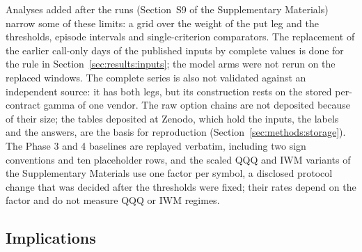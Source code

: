 Analyses added after the runs (Section~S9 of the Supplementary Materials) narrow some of these limits: a grid over the weight of the put leg and the thresholds, episode intervals and single-criterion comparators. The replacement of the earlier call-only days of the published inputs by complete values is done for the rule in Section~\ref{sec:results:inputs}; the model arms were not rerun on the replaced windows. The complete series is also not validated against an independent source: it has both legs, but its construction rests on the stored per-contract gamma of one vendor.
The raw option chains are not deposited because of their size; the tables deposited at Zenodo, which hold the inputs, the labels and the answers, are the basis for reproduction (Section~\ref{sec:methods:storage}).
The Phase 3 and 4 baselines are replayed verbatim, including two sign conventions and ten placeholder rows, and the scaled QQQ and IWM variants of the Supplementary Materials use one factor per symbol, a disclosed protocol change that was decided after the thresholds were fixed; their rates depend on the factor and do not measure QQQ or IWM regimes.

\subsection{Implications}
\label{sec:discussion:implications}

